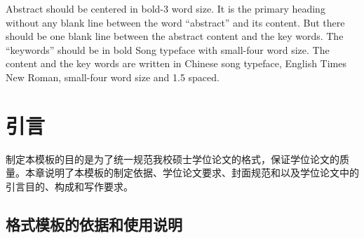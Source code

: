 \documentclass{cqupt_thesis}
\begin{document}
\begin{enabstract}
        Abstract should be centered in bold-3 word size. It is the primary heading without any blank line between the word “abstract” and its content. But there should be one blank line between the abstract content and the key words. The “keywords” should be in bold Song typeface with small-four word size. The content and the key words are written in Chinese song typeface, English Times New Roman, small-four word size and 1.5 spaced.

    \end{enabstract}

    {\def\makebox[#1][#2]#3{#3}%
        \clearpage
        \tableofcontents
        \thispagestyle{fancy}
    }
    {\def\makebox[#1][#2]#3{#3}%
        \clearpage
        \listoffigures
        \thispagestyle{fancy}
    }
    {\def\makebox[#1][#2]#3{#3}%
        \clearpage
        \listoftables
        \thispagestyle{fancy}
    }




    \initmaincontent %


    \chapter{引言}

    制定本模板的目的是为了统一规范我校硕士学位论文的格式，保证学位论文的质量。本章说明了本模板的制定依据、学位论文要求、封面规范和以及学位论文中的引言目的、构成和写作要求。


    \section{格式模板的依据和使用说明}
\end{document}
